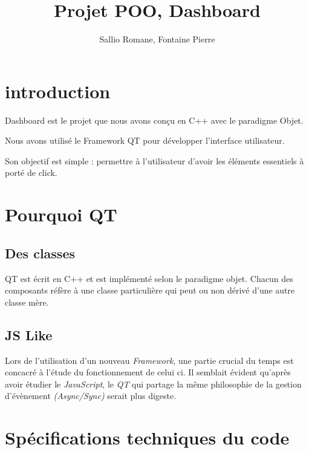 \documentclass[10pt]{beamer}
\title{Projet POO, Dashboard}
\author{Sallio Romane, Fontaine Pierre}
\institute{UPPA}
\begin{document}
  \begin{frame}
    \titlepage
  \end{frame}
  \begin{frame}
    \tableofcontents
  \end{frame}
  \section{introduction}
    \begin{frame}
      Dashboard est le projet que nous avons conçu en C++ avec le paradigme Objet.

      Nous avons utilisé le Framework QT pour développer l'interface utilisateur.

      Son objectif est simple : permettre à l'utilisateur d'avoir les éléments essentiels à porté de click.
    \end{frame}
  \section{Pourquoi QT}
    \subsection{Des classes}
    \begin{frame}
      QT est écrit en C++ et est implémenté selon le paradigme objet. Chacun des composants réfère à une classe particulière qui peut ou non dérivé d'une autre classe mère.
    \end{frame}
    \subsection{JS Like}
      \begin{frame}
        Lors de l'utilisation d'un nouveau \emph{Framework}, une partie crucial du temps est concacré à l'étude du fonctionnement de celui ci. Il semblait évident qu'après avoir étudier le \emph{JavaScript}, le \emph{QT} qui partage la même philosophie de la gestion d'évènement \emph{(Async/Sync)} serait plus digeste.
      \end{frame}
  \section{Spécifications techniques du code}
\end{document}

